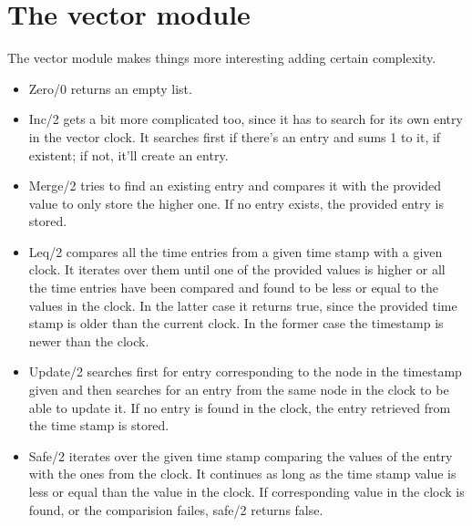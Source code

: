 \documentclass[a4paper, 11pt]{article}
\begin{document}
\section{The vector module}
The vector module makes things more interesting adding certain complexity.
\begin{itemize}
    \item Zero/0 returns an empty list.
    \item Inc/2 gets a bit more complicated too, since it has to search for its own entry in the vector clock. It searches first if there's an entry and sums 1 to it, if existent; if not, it'll create an entry.
    \item Merge/2  tries to find an existing entry and compares it with the provided value to only store the higher one. If no entry exists, the provided entry is stored.
    \item Leq/2 compares all the time entries from a given time stamp with a given clock.
    It iterates over them until one of the provided values is higher or all the time entries have been compared and found to be less or equal to the values in the clock.
    In the latter case it returns true, since the provided time stamp is older than the current clock. In the former case the timestamp is newer than the clock.
    \item Update/2 searches first for entry corresponding to the node in the timestamp given and then searches for an entry from the same node in the clock to be able to update it. If no entry is found in the clock, the entry retrieved from the time stamp is stored.
    \item Safe/2 iterates over the given time stamp comparing the values of the entry with the ones from the clock.
    It continues as long as the time stamp value is less or equal than the value in the clock.
    If corresponding value in the clock is found, or the comparision failes, safe/2 returns false.
\end{itemize}
\end{document}
